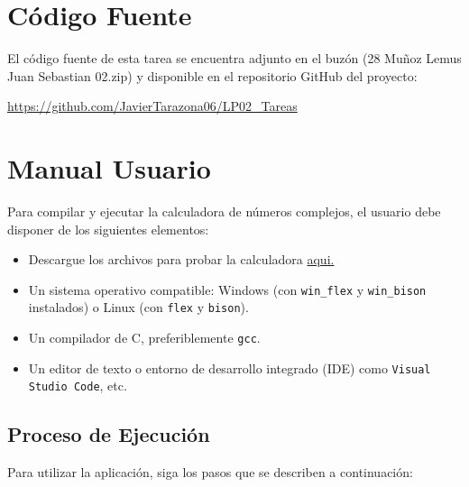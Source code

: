 \documentclass{article}
\begin{document}
\section{Código Fuente}\label{sec:cod}

El código fuente de esta tarea se encuentra adjunto en el buzón 
(28 Muñoz Lemus Juan Sebastian 02.zip)
y disponible en el repositorio GitHub del proyecto:

\begin{center}
\url{https://github.com/JavierTarazona06/LP02_Tareas}
\end{center}


\section{Manual Usuario}\label{sec:man_u}

Para compilar y ejecutar la calculadora de números complejos, el usuario debe disponer de los siguientes elementos:

\begin{itemize}
    \item Descargue los archivos para probar la calculadora \href{https://github.com/JavierTarazona06/LP02_Tareas/tree/main/Tarea28/Code}{aqui.}
    \item Un sistema operativo compatible: Windows (con \texttt{win\_flex} y \texttt{win\_bison} instalados) o Linux (con \texttt{flex} y \texttt{bison}).
    \item Un compilador de C, preferiblemente \texttt{gcc}.
    \item Un editor de texto o entorno de desarrollo integrado (IDE) como \texttt{Visual Studio Code}, etc.
\end{itemize}

\subsection*{Proceso de Ejecución}

Para utilizar la aplicación, siga los pasos que se describen a continuación:
\end{document}
